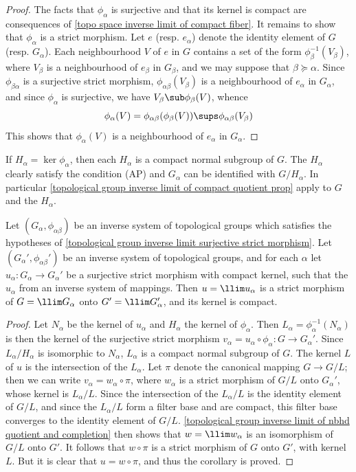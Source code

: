 \begin{proof}
The facts that $\phi_\alpha$ is surjective and that its kernel is compact are consequences of \cref{topo space inverse limit of compact fiber}. It remains to show that $\phi_\alpha$ is a strict morphism. Let $e$ (resp. $e_\alpha$) denote the identity element of $G$ (resp. $G_\alpha$). Each neighbourhood $V$ of $e$ in $G$ contains a set of the form $\phi_\beta^{-1}(V_\beta)$, where $V_\beta$ is a neighbourhood of $e_\beta$ in $G_\beta$, and we may suppose that $\beta\succeq\alpha$. Since $\phi_{\beta\alpha}$ is a surjective strict morphism, $\phi_{\alpha\beta}(V_\beta)$ is a neighbourhood of $e_\alpha$ in $G_\alpha$, and since $\phi_\alpha$ is surjective, we have $V_\beta\sub\phi_\beta(V)$, whence
\[\phi_\alpha(V)=\phi_{\alpha\beta}(\phi_\beta(V))\sups\phi_{\alpha\beta}(V_\beta)\]
This shows that $\phi_\alpha(V)$ is a neighbourhood of $e_\alpha$ in $G_\alpha$.
\end{proof}
If $H_\alpha=\ker\phi_\alpha$, then each $H_\alpha$ is a compact normal subgroup of $G$. The $H_\alpha$ clearly satisfy the condition (AP) and $G_\alpha$ can be identified with $G/H_\alpha$. In particular \cref{topological group inverse limit of compact quotient prop} apply to $G$ and the $H_\alpha$.
\begin{corollary}\label{topological group inverse limit of surjective strict morphisms}
Let $(G_\alpha,\phi_{\alpha\beta})$ be an inverse system of topological groups which satisfies the hypotheses of \cref{topological group inverse limit surjective strict morphism}. Let $(G_\alpha',\phi_{\alpha\beta}')$ be an inverse system of topological groups, and for each $\alpha$ let $u_\alpha:G_\alpha\to G_\alpha'$ be a surjective strict morphism with compact kernel, such that the $u_\alpha$ from an inverse system of mappings. Then $u=\llim u_\alpha$ is a strict morphism of $G=\llim G_\alpha$ onto $G'=\llim G_\alpha'$, and its kernel is compact.
\end{corollary}
\begin{proof}
Let $N_\alpha$ be the kernel of $u_\alpha$ and $H_\alpha$ the kernel of $\phi_\alpha$. Then $L_\alpha=\phi_\alpha^{-1}(N_\alpha)$ is then the kernel of the surjective strict morphism $v_\alpha=u_\alpha\circ\phi_\alpha:G\to G_\alpha'$. Since $L_\alpha/H_\alpha$ is isomorphic to $N_\alpha$, $L_\alpha$ is a compact normal subgroup of $G$. The kernel $L$ of $u$ is the intersection of the $L_\alpha$. Let $\pi$ denote the canonical mapping $G\to G/L$; then we can write $v_\alpha=w_\alpha\circ\pi$, where $w_\alpha$ is a strict morphism of $G/L$ onto $G_\alpha'$, whose kernel is $L_\alpha/L$. Since the intersection of the $L_\alpha/L$ is the identity element of $G/L$, and since the $L_\alpha/L$ form a filter base and are compact, this filter base converges to the identity element of $G/L$. \cref{topological group inverse limit of nbhd quotient and completion} then shows that $w=\llim w_\alpha$ is an isomorphism of $G/L$ onto $G'$. It follows that $w\circ\pi$ is a strict morphism of $G$ onto $G'$, with kernel $L$. But it is clear that $u=w\circ\pi$, and thus the corollary is proved.
\end{proof}
